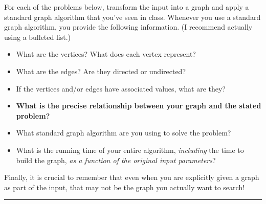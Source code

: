 \documentclass[11pt]{article}
\begin{document}

\noindent 
For each of the problems below, transform the input into a graph and apply a standard graph algorithm that you’ve seen in class.  Whenever you use a standard graph algorithm, you  provide the following information.  (I recommend actually using a bulleted list.)
\begin{itemize}\itemsep0pt
\item What are the vertices?  What does each vertex represent?
\item What are the edges?  Are they directed or undirected?
\item If the vertices and/or edges have associated values, what are they?
\item \textbf{What is the precise relationship between your graph and the stated problem?}
\item What standard graph algorithm are you using to solve the problem?
\item What is the running time of your entire algorithm, \emph{including} the time to build the graph, \emph{as a function of the original input parameters}?
\end{itemize}
Finally, it is crucial to remember that even when you are explicitly given a graph as part of the input, that may not be the graph you actually want to search!

\bigskip
\hrule
\medskip
\end{document}
